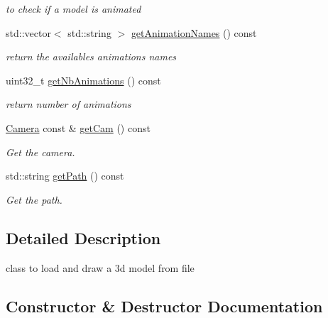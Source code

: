 \begin{DoxyCompactItemize}
\begin{DoxyCompactList}\small\item\em to check if a model is animated \end{DoxyCompactList}\item 
std\+::vector$<$ std\+::string $>$ \hyperlink{class_open_g_l_model_a5627bd93c06f92a7759691854b23d290}{get\+Animation\+Names} () const
\begin{DoxyCompactList}\small\item\em return the availables animations names \end{DoxyCompactList}\item 
uint32\+\_\+t \hyperlink{class_open_g_l_model_a0f2a5be64c50e5e5fc680575cd5e710c}{get\+Nb\+Animations} () const
\begin{DoxyCompactList}\small\item\em return number of animations \end{DoxyCompactList}\item 
\hyperlink{class_camera}{Camera} const  \& \hyperlink{class_open_g_l_model_aec911d785c7eab28ab2de3787d331290}{get\+Cam} () const
\begin{DoxyCompactList}\small\item\em Get the camera. \end{DoxyCompactList}\item 
std\+::string \hyperlink{class_open_g_l_model_ac7acbc5f8890c277e01fbad776ebe368}{get\+Path} () const
\begin{DoxyCompactList}\small\item\em Get the path. \end{DoxyCompactList}\end{DoxyCompactItemize}


\subsection{Detailed Description}
class to load and draw a 3d model from file 

\subsection{Constructor \& Destructor Documentation}
\mbox{\label{class_open_g_l_model_a5cd104e3a2b45f37809bc8cc80444cff}} 
